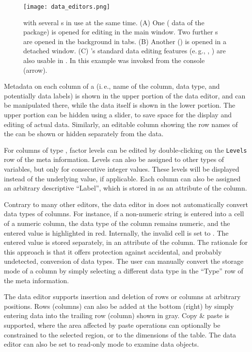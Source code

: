 \begin{figure}[t!]
 \centering
 \texttt{[image: data\_editors.png]}
 \caption{ with several s in use at the same time. (A) 
  One  ( data of the  package) is opened for editing in the main window. Two further s
  are opened in the background in tabs. 
  (B) Another  () is opened in a detached window. 
  (C) 's standard data editing features (e.\,g., , ) 
  are also usable in . In this example  
  was invoked from the console (arrow).}
 \label{fig:data_editors}
\end{figure}

Metadata on each column of a  (i.\,e., name of the column, data
type, and potentially data labels) is shown in the upper portion of
the data editor, and can be manipulated there, while the data itself is
shown in the lower portion. The upper portion can be hidden using a
slider, to save space for the display and editing of actual data.
Similarly, an editable column showing the row names of the 
can be shown or hidden separately from the data.

For columns of type , factor levels can be edited by double-clicking on the
\texttt{Levels} row of the meta information. Levels can also be assigned to other types of
variables, but only for consecutive integer values. These levels will
be displayed instead of the underlying value, if applicable. Each
column can also be assigned an arbitrary descriptive
``Label'', which is stored in
 as an attribute of the column.

Contrary to many other editors, the data editor in  does not
automatically convert data types of columns. For instance, if a
non-numeric string is entered into a cell of a numeric column, the data
type of the column remains numeric, and the entered value is
highlighted in red. Internally, the invalid cell is set to .
The entered value is stored separately, in an attribute of the column.
The rationale for this approach is that it offers protection against
accidental, and probably undetected, conversion of data types. The
user can manually convert the storage mode of a column by simply
selecting a different data type in the ``Type'' row of the meta information.

The data editor supports insertion and deletion of rows or columns at 
arbitrary positions. Rows (columns) can also be added at the bottom 
(right) by simply entering data into the trailing row (column) shown in
gray. Copy \& paste is supported, where the area affected by paste
operations can optionally be constrained to the selected region, or to
the dimensions of the table. The data editor can also be set to read-only
mode to examine data objects.

